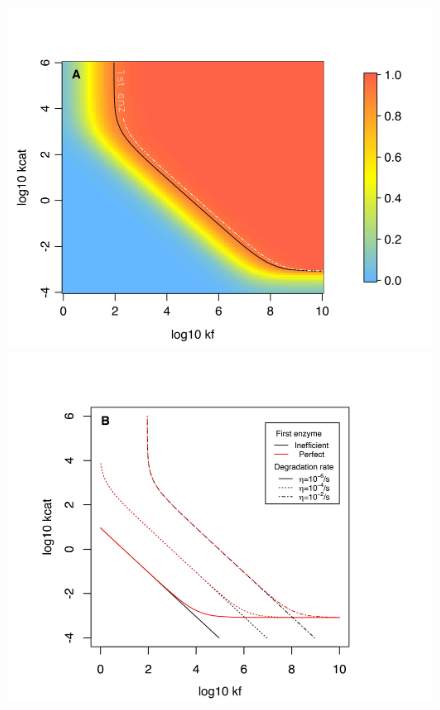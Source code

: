 \documentclass[nogrid,crop,final]{MBE2}%
\begin{document}
\begin{figure}[t!]
\centering
\begin{minipage}[c]{0.48\linewidth}
\includegraphics[scale=0.65,trim=0cm 0cm 0cm 1.5cm,clip]{Figures/2DFitLandscape_etahigh_noreverse.jpeg} 
\end{minipage} \hfill
\begin{minipage}[c]{0.48\linewidth}
\includegraphics[scale=0.65,trim=0cm 0cm 0cm 1.5cm,clip]{Figures/2DFit_Landscape_2Enz_First_Enz_Influence.jpeg} 

\end{minipage}
\end{figure}
\end{document}
